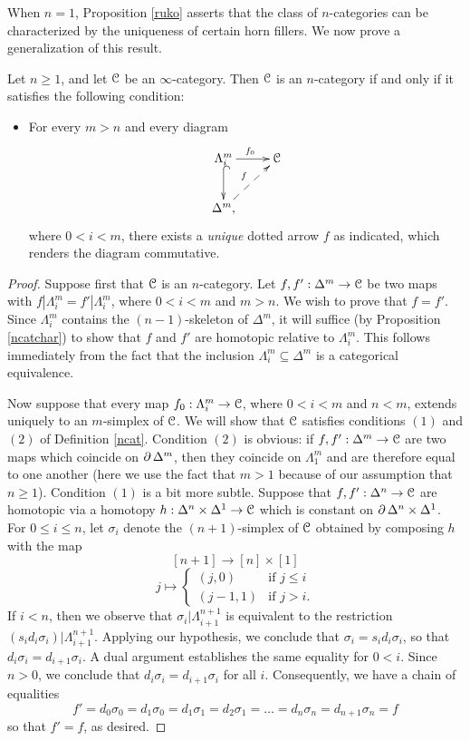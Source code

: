 When $n=1$, Proposition \ref{ruko} asserts that the class of $n$-categories can be characterized by the uniqueness of certain horn fillers. We now prove a generalization of this result.

\begin{proposition}\label{ruko2}
Let $n \geq 1$, and let $\operatorname{\mathcal{C}}$ be an $\infty$-category. Then $\operatorname{\mathcal{C}}$ is an $n$-category if and only if it satisfies the following condition:
\begin{itemize}
\item For every $m > n$ and every diagram
$$ \xymatrix{ \Lambda^m_i \ar[r]^{f_0} \ar@{^{(}->}[d] & \calC \\
\Delta^m, \ar@{-->}[ur]^{f} & }$$
where $0 < i < m$, there exists a {\em unique} dotted arrow $f$ as indicated, which renders the diagram commutative.
\end{itemize}
\end{proposition}

\begin{proof}
Suppose first that $\operatorname{\mathcal{C}}$ is an $n$-category. Let $f,f': \Delta^m \rightarrow \operatorname{\mathcal{C}}$
be two maps with $f | \Lambda^m_i = f' | \Lambda^m_i$, where $0 < i < m$ and
$m > n$. We wish to prove that $f = f'$. Since $\Lambda^m_i$ contains the $(n-1)$-skeleton of
$\Delta^m$, it will suffice (by Proposition \ref{ncatchar}) to show that $f$ and $f'$
are homotopic relative to $\Lambda^m_i$. This follows immediately from the fact that the inclusion $\Lambda^m_i \subseteq \Delta^m$ is a categorical equivalence.

Now suppose that every map $f_0: \Lambda^m_i \rightarrow \operatorname{\mathcal{C}}$, where
$0 < i < m$ and $n < m$, extends uniquely to an $m$-simplex of $\operatorname{\mathcal{C}}$.
We will show that $\operatorname{\mathcal{C}}$ satisfies conditions $(1)$ and $(2)$ of Definition \ref{ncat}.
Condition $(2)$ is obvious: if $f,f': \Delta^m \rightarrow \operatorname{\mathcal{C}}$ are two maps which
coincide on $\operatorname{\partial} \Delta^m$, then they coincide on $\Lambda^m_1$ and are
therefore equal to one another (here we use the fact that $m > 1$ because of our assumption that $n \geq 1$).
Condition $(1)$ is a bit more subtle. Suppose that $f,f': \Delta^n \rightarrow \operatorname{\mathcal{C}}$ are
homotopic via a homotopy $h: \Delta^n \times \Delta^1 \rightarrow \operatorname{\mathcal{C}}$
which is constant on $\operatorname{\partial} \Delta^n \times \Delta^1$. For $0 \leq i \leq n$, let
$\sigma_i$ denote the $(n+1)$-simplex of $\operatorname{\mathcal{C}}$ obtained by composing
$h$ with the map
$$ [n+1] \rightarrow [n] \times [1]$$
$$ j \mapsto \begin{cases} (j,0) & \text{if } j \leq i \\
(j-1,1) & \text{if } j > i. \end{cases}$$
If $i < n$, then we observe that $\sigma_i | \Lambda^{n+1}_{i+1}$ is equivalent
to the restriction $( s_i d_i \sigma_i ) | \Lambda^{n+1}_{i+1}$. Applying our hypothesis, we conclude that $\sigma_i = s_i d_i \sigma_i$, so that $d_i \sigma_i = d_{i+1} \sigma_i$. A dual argument
establishes the same equality for $0 < i$. Since $n > 0$, we conclude that
$d_i \sigma_i = d_{i+1} \sigma_i$ for all $i$. Consequently, we have a chain of equalities
$$ f' = d_0 \sigma_0 = d_1 \sigma_0 = d_1 \sigma_1 = d_2 \sigma_1 = \ldots
= d_{n} \sigma_n = d_{n+1} \sigma_n = f$$
so that $f' = f$, as desired.
\end{proof}

